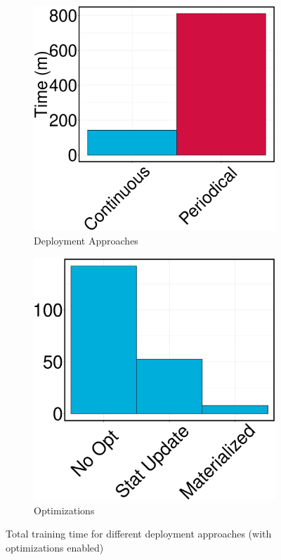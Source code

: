 \begin{figure}[h]
\begin{subfigure}{\columnwidth}
\centering
\includegraphics[width=\columnwidth]{../images/experiment-results/criteo-training-time-deployment-types-experiment.eps}
\caption{Deployment Approaches}
\label{fig:training-time-deployment}
\end{subfigure}
\begin{subfigure}{\columnwidth}
\centering
\includegraphics[width=\columnwidth]{../images/experiment-results/criteo-training-time-optimizations-experiment.eps}
\caption{Optimizations}
\label{fig:training-time-optimization}
\end{subfigure}
\vspace{2mm}
\caption{Total training time for different deployment approaches (with optimizations enabled)}
\end{figure}

